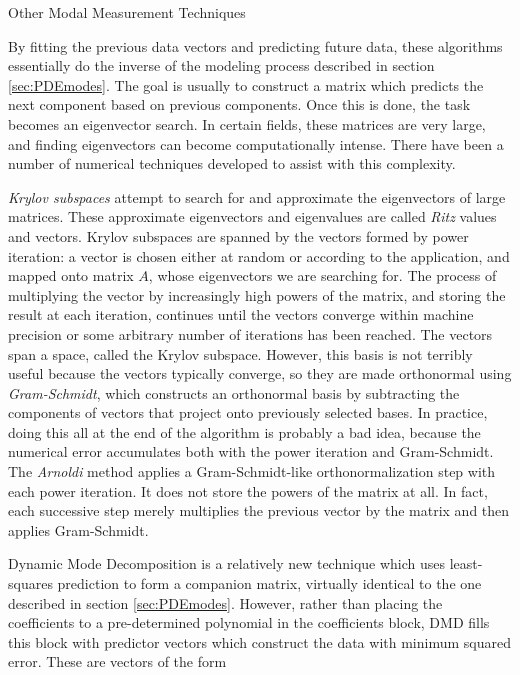 \documentclass[a4paper,10pt]{report}
\numberwithin{equation}{section}
\begin{document}
{\begin{chapter}
\begin{section}{Other Modal Measurement Techniques}
\par
By fitting the previous data vectors and predicting future data, these algorithms essentially do the inverse of the modeling process described in section \ref{sec:PDEmodes}. The goal is usually to construct a matrix which predicts the next component based on previous components. Once this is done, the task becomes an eigenvector search. In certain fields, these matrices are very large, and finding eigenvectors can become computationally intense. There have been a number of numerical techniques developed to assist with this complexity. 
\par
\emph{Krylov subspaces} attempt to search for and approximate the eigenvectors of large matrices. These approximate eigenvectors and eigenvalues are called \emph{Ritz} values and vectors. Krylov subspaces are spanned by the vectors formed by power iteration: a vector is chosen either at random or according to the application, and mapped onto matrix $A$, whose eigenvectors we are searching for. The process of multiplying the vector by increasingly high powers of the matrix, and storing the result at each iteration, continues until the vectors converge within machine precision or some arbitrary number of iterations has been reached. The vectors span a space, called the Krylov subspace. \cite[p.~428]{Watkins2010} However, this basis is not terribly useful because the vectors typically converge, so they are made orthonormal using \emph{Gram-Schmidt}, which constructs an orthonormal basis by subtracting the components of vectors that project onto previously selected bases. \cite[p.~234]{Strang2009} In practice, 
doing this all at the end of the algorithm is probably a bad idea, because the numerical error accumulates both with the power iteration and Gram-Schmidt. \cite[p.~439]{Watkins2010} The \emph{Arnoldi} method applies a Gram-Schmidt-like orthonormalization step with each power iteration. It does not store the powers of the matrix at all. In fact, each successive step merely multiplies the previous vector by the matrix and then applies Gram-Schmidt. \cite[p.~440]{Watkins2010} 
\par
Dynamic Mode Decomposition \cite{Chen2012} is a relatively new technique which uses least-squares prediction to form a companion matrix, virtually identical to the one described in section \ref{sec:PDEmodes}. However, rather than placing the coefficients to a pre-determined polynomial in the coefficients block, DMD fills this block with predictor vectors which construct the data with minimum squared error. These are vectors of the form

\end{section}
\end{chapter}}
\end{document}
